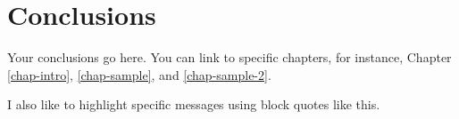 \chapter[Conclusions]{Conclusions}\label{chap-conc}

Your conclusions go here. You can link to specific chapters, for instance, Chapter \ref{chap-intro}, \ref{chap-sample}, and \ref{chap-sample-2}.


\begin{center} \begin{blockquote}
I also like to highlight specific messages using block quotes like this.
\end{blockquote} \end{center}